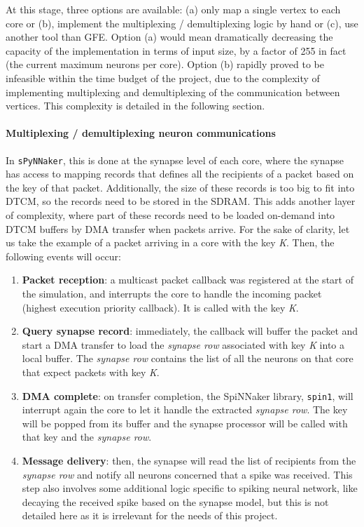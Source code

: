 At this stage, three options are available: (a) only map a single vertex to each core or (b), implement the multiplexing / demultiplexing logic by hand or (c), use another tool than GFE. Option (a) would mean dramatically decreasing the capacity of the implementation in terms of input size, by a factor of 255 in fact (the current maximum neurons per core). Option (b) rapidly proved to be infeasible within the time budget of the project, due to the complexity of implementing multiplexing and demultiplexing of the communication between vertices. This complexity is detailed in the following section.

\paragraph{Multiplexing / demultiplexing neuron communications} \label{sec:mplx}

In \texttt{sPyNNaker}, this is done at the synapse level of each core, where the synapse has access to mapping records that defines all the recipients of a packet based on the key of that packet. Additionally, the size of these records is too big to fit into DTCM, so the records need to be stored in the SDRAM. This adds another layer of complexity, where part of these records need to be loaded on-demand into DTCM buffers by DMA transfer when packets arrive. For the sake of clarity, let us take the example of a packet arriving in a core  with the key \textit{K}. Then, the following events will occur:

\begin{enumerate}
\item \textbf{Packet reception}: a multicast packet callback was registered at the start of the simulation, and interrupts the core to handle the incoming packet (highest execution priority callback). It is called with the key \textit{K}. 

\item \textbf{Query synapse record}: immediately, the callback will buffer the packet and start a DMA transfer to load the \textit{synapse row} associated with key \textit{K} into a local buffer. The \textit{synapse row} contains the list of all the neurons on that core that expect packets with key \textit{K}.

\item \textbf{DMA complete}: on transfer completion, the SpiNNaker library, \texttt{spin1}, will interrupt again the core to let it handle the extracted \textit{synapse row}. The key will be popped from its buffer and the synapse processor will be called with that key and the \textit{synapse row}.

\item \textbf{Message delivery}: then, the synapse will read the list of recipients from the \textit{synapse row} and notify all neurons concerned that a spike was received. This step also involves some additional logic specific to spiking neural network, like decaying the received spike based on the synapse model, but this is not detailed here as it is irrelevant for the needs of this project.
\end{enumerate}

